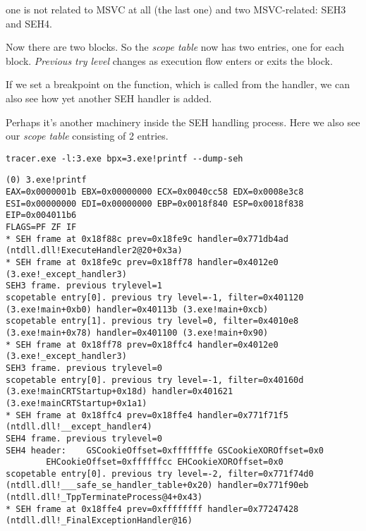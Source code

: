 one is not related to MSVC at all (the last one) and two MSVC-related: SEH3 and SEH4.




Now there are two  blocks.
So the \emph{scope table} now has two entries, one for each block.
\emph{Previous try level} changes as execution flow enters or exits the  block.



If we set a breakpoint on the \printf{} function, which is called from the handler, 
we can also see how yet another SEH handler is added.

Perhaps it's another machinery inside the SEH handling process.
Here we also see our \emph{scope table} consisting of 2 entries.

\begin{lstlisting}
tracer.exe -l:3.exe bpx=3.exe!printf --dump-seh
\end{lstlisting}

\begin{lstlisting}[caption=tracer.exe output]
(0) 3.exe!printf
EAX=0x0000001b EBX=0x00000000 ECX=0x0040cc58 EDX=0x0008e3c8
ESI=0x00000000 EDI=0x00000000 EBP=0x0018f840 ESP=0x0018f838
EIP=0x004011b6
FLAGS=PF ZF IF
* SEH frame at 0x18f88c prev=0x18fe9c handler=0x771db4ad (ntdll.dll!ExecuteHandler2@20+0x3a)
* SEH frame at 0x18fe9c prev=0x18ff78 handler=0x4012e0 (3.exe!_except_handler3)
SEH3 frame. previous trylevel=1
scopetable entry[0]. previous try level=-1, filter=0x401120 (3.exe!main+0xb0) handler=0x40113b (3.exe!main+0xcb)
scopetable entry[1]. previous try level=0, filter=0x4010e8 (3.exe!main+0x78) handler=0x401100 (3.exe!main+0x90)
* SEH frame at 0x18ff78 prev=0x18ffc4 handler=0x4012e0 (3.exe!_except_handler3)
SEH3 frame. previous trylevel=0
scopetable entry[0]. previous try level=-1, filter=0x40160d (3.exe!mainCRTStartup+0x18d) handler=0x401621 (3.exe!mainCRTStartup+0x1a1)
* SEH frame at 0x18ffc4 prev=0x18ffe4 handler=0x771f71f5 (ntdll.dll!__except_handler4)
SEH4 frame. previous trylevel=0
SEH4 header:	GSCookieOffset=0xfffffffe GSCookieXOROffset=0x0
		EHCookieOffset=0xffffffcc EHCookieXOROffset=0x0
scopetable entry[0]. previous try level=-2, filter=0x771f74d0 (ntdll.dll!___safe_se_handler_table+0x20) handler=0x771f90eb (ntdll.dll!_TppTerminateProcess@4+0x43)
* SEH frame at 0x18ffe4 prev=0xffffffff handler=0x77247428 (ntdll.dll!_FinalExceptionHandler@16)
\end{lstlisting}

